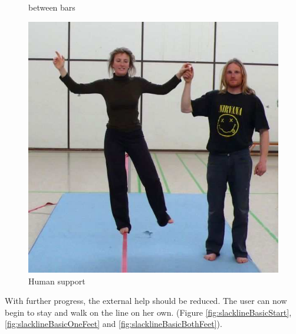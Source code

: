 \begin{figure}[htb]
\begin{minipage}[t]{0.38\linewidth}
		\caption{between bars \cite{Kroiss2007-ab}}
		\label{fig:slacklineHelpBar}
	\end{minipage}
	\hfill
	\begin{minipage}[t]{0.3\linewidth}
		\centering
		\includegraphics[width=1\linewidth]{Pictures/slacklineHelpHuman}
		\caption{Human support \cite{Kroiss2007-ab}}
		\label{fig:slacklineHelpHuman}
	\end{minipage}
\end{figure}

With further progress, the external help should be reduced. The user can now begin to stay and walk on the line on her own. (Figure \ref{fig:slacklineBasicStart}, \ref{fig:slacklineBasicOneFeet} and \ref{fig:slacklineBasicBothFeet}). 

